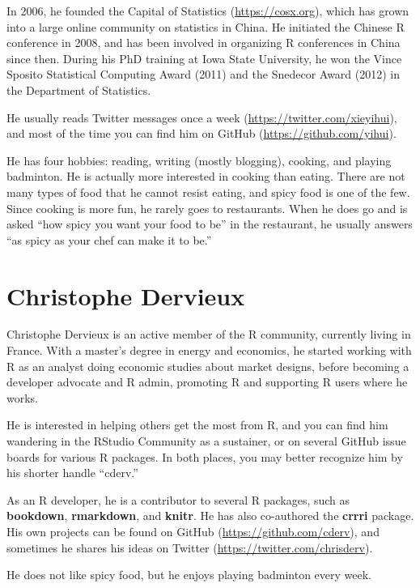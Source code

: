 \documentclass[
  11pt,
]{krantz}
\begin{document}
In 2006, he founded the Capital of Statistics (\url{https://cosx.org}), which has grown into a large online community on statistics in China. He initiated the Chinese R conference in 2008, and has been involved in organizing R conferences in China since then. During his PhD training at Iowa State University, he won the Vince Sposito Statistical Computing Award (2011) and the Snedecor Award (2012) in the Department of Statistics.

He usually reads Twitter messages once a week (\url{https://twitter.com/xieyihui}), and most of the time you can find him on GitHub (\url{https://github.com/yihui}).

He has four hobbies: reading, writing (mostly blogging), cooking, and playing badminton. He is actually more interested in cooking than eating. There are not many types of food that he cannot resist eating, and spicy food is one of the few. Since cooking is more fun, he rarely goes to restaurants. When he does go and is asked ``how spicy you want your food to be'' in the restaurant, he usually answers ``as spicy as your chef can make it to be.''

\hypertarget{christophe-dervieux}{%
\section*{Christophe Dervieux}\label{christophe-dervieux}}


Christophe Dervieux is an active member of the R community, currently living in France. With a master's degree in energy and economics, he started working with R as an analyst doing economic studies about market designs, before becoming a developer advocate and R admin, promoting R and supporting R users where he works.

He is interested in helping others get the most from R, and you can find him wandering in the RStudio Community as a sustainer, or on several GitHub issue boards for various R packages. In both places, you may better recognize him by his shorter handle ``cderv.''

As an R developer, he is a contributor to several R packages, such as \textbf{bookdown}, \textbf{rmarkdown}, and \textbf{knitr}. He has also co-authored the \textbf{crrri} package. His own projects can be found on GitHub (\url{https://github.com/cderv}), and sometimes he shares his ideas on Twitter (\url{https://twitter.com/chrisderv}).

He does not like spicy food, but he enjoys playing badminton every week.
\end{document}
